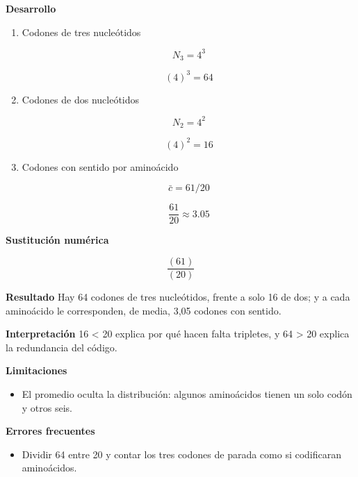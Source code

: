 \documentclass{book}
\begin{document}
\begin{tcolorbox}[title={Problema resuelto}, studiumworked, breakable]
\begin{enumerate}
\end{enumerate}

\noindent\textbf{Desarrollo}
\begin{enumerate}
\item
Codones de tres nucleótidos


\[
N_3 = 4^3
\]

\[
\left(4\right)^{3} = 64
\]
\item
Codones de dos nucleótidos


\[
N_2 = 4^2
\]

\[
\left(4\right)^{2} = 16
\]
\item
Codones con sentido por aminoácido


\[
\bar{c} = 61/20
\]

\[
\frac{61}{20} \approx 3.05
\]
\end{enumerate}

\noindent\textbf{Sustitución numérica}

\[
\frac{\left(61\right)}{\left(20\right)}
\]

\noindent\textbf{Resultado}
Hay 64 codones de tres nucleótidos, frente a solo 16 de dos; y a cada aminoácido le corresponden, de media, 3,05 codones con sentido.


\noindent\textbf{Interpretación}
16 < 20 explica por qué hacen falta tripletes, y 64 > 20 explica la redundancia del código.


\noindent\textbf{Limitaciones}
\begin{itemize}
\item El promedio oculta la distribución: algunos aminoácidos tienen un solo codón y otros seis.
\end{itemize}

\noindent\textbf{Errores frecuentes}
\begin{itemize}
\item Dividir 64 entre 20 y contar los tres codones de parada como si codificaran aminoácidos.
\end{itemize}
\end{tcolorbox}
\end{document}
